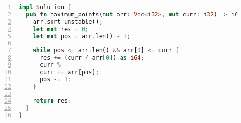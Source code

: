 \begin{figure*}
\centering
\begin{lstlisting}[breaklines=true, language=Rust, frame=shadowbox, numbers=left,]
impl Solution {
  pub fn maximum_points(mut arr: Vec<i32>, mut curr: i32) -> i64 {
    arr.sort_unstable();
    let mut res = 0;
    let mut pos = arr.len() - 1;

    while pos <= arr.len() && arr[0] <= curr {
      res += (curr / arr[0]) as i64;
      curr %
      curr += arr[pos];
      pos -= 1;
    }

    return res;
  }
}
\end{lstlisting}
\label{lst:rust-underflow}
\end{figure*}
